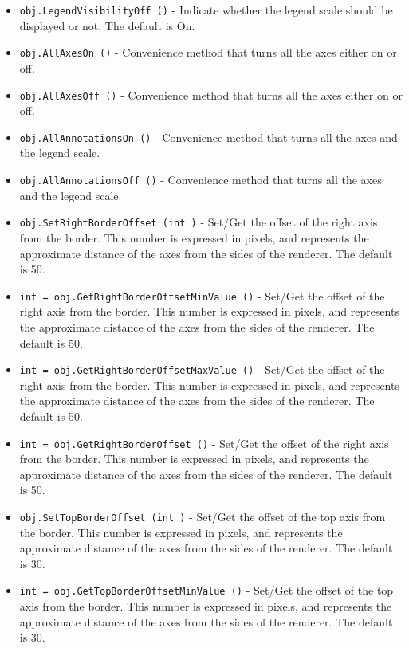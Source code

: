 \begin{itemize}
\item  \verb|obj.LegendVisibilityOff ()| -  Indicate whether the legend scale should be displayed or not.
 The default is On.

\item  \verb|obj.AllAxesOn ()| -  Convenience method that turns all the axes either on or off.

\item  \verb|obj.AllAxesOff ()| -  Convenience method that turns all the axes either on or off.

\item  \verb|obj.AllAnnotationsOn ()| -  Convenience method that turns all the axes and the legend scale.

\item  \verb|obj.AllAnnotationsOff ()| -  Convenience method that turns all the axes and the legend scale.

\item  \verb|obj.SetRightBorderOffset (int )| -  Set/Get the offset of the right axis from the border. This number is expressed in
 pixels, and represents the approximate distance of the axes from the sides
 of the renderer. The default is 50.

\item  \verb|int = obj.GetRightBorderOffsetMinValue ()| -  Set/Get the offset of the right axis from the border. This number is expressed in
 pixels, and represents the approximate distance of the axes from the sides
 of the renderer. The default is 50.

\item  \verb|int = obj.GetRightBorderOffsetMaxValue ()| -  Set/Get the offset of the right axis from the border. This number is expressed in
 pixels, and represents the approximate distance of the axes from the sides
 of the renderer. The default is 50.

\item  \verb|int = obj.GetRightBorderOffset ()| -  Set/Get the offset of the right axis from the border. This number is expressed in
 pixels, and represents the approximate distance of the axes from the sides
 of the renderer. The default is 50.

\item  \verb|obj.SetTopBorderOffset (int )| -  Set/Get the offset of the top axis from the border. This number is expressed in
 pixels, and represents the approximate distance of the axes from the sides
 of the renderer. The default is 30.

\item  \verb|int = obj.GetTopBorderOffsetMinValue ()| -  Set/Get the offset of the top axis from the border. This number is expressed in
 pixels, and represents the approximate distance of the axes from the sides
 of the renderer. The default is 30.


\end{itemize}
